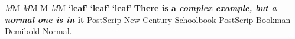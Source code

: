 \documentclass{article}
\begin{document}
            {\itshape M}M \quad \textit{M}M M\newline
            \textit{M\nocorr}M\newline         %
            `{\bfseries leaf}' \quad `{\bfseries leaf\/}' \quad `\textbf{leaf}'\newline
                \newline
            {\sffamily \textbf{There is a \textit{complex example, 
            but \textnormal{a normal one} is in} it}}\newline
            {\fontsize{14}{17}
            \selectfont PostScrip New Century Schoolbook}\newline
            { PostScrip Bookman Demibold Normal. }
\end{document}
